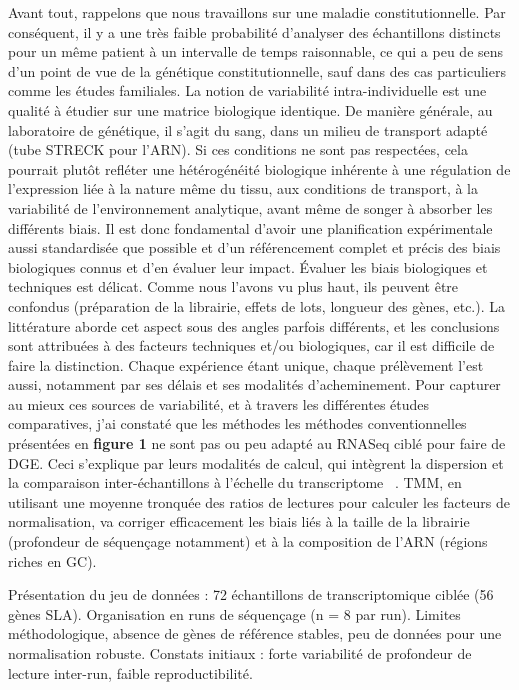 Avant tout, rappelons que nous travaillons sur une maladie constitutionnelle. Par conséquent, il y a une très faible probabilité d'analyser des échantillons distincts pour un même patient à un intervalle de temps raisonnable, ce qui a peu de sens d'un point de vue de la génétique constitutionnelle, sauf dans des cas particuliers comme les études familiales. La notion de variabilité intra-individuelle est une qualité à étudier sur une matrice biologique identique. De manière générale, au laboratoire de génétique, il s'agit du sang, dans un milieu de transport adapté (tube STRECK pour l'ARN). Si ces conditions ne sont pas respectées, cela pourrait plutôt refléter une hétérogénéité biologique inhérente à une régulation de l'expression liée à la nature même du tissu, aux conditions de transport, à la variabilité de l'environnement analytique, avant même de songer à absorber les différents biais.
Il est donc fondamental d'avoir une planification expérimentale aussi standardisée que possible et d'un référencement complet et précis des biais biologiques connus et d'en évaluer leur impact.
Évaluer les biais biologiques et techniques est délicat. Comme nous l'avons vu plus haut, ils peuvent être confondus (préparation de la librairie, effets de lots, longueur des gènes, etc.).
La littérature aborde cet aspect sous des angles parfois différents, et les conclusions sont attribuées à des facteurs techniques et/ou biologiques, car il est difficile de faire la distinction. 
 Chaque expérience étant unique, chaque prélèvement l'est aussi, notamment par ses délais et ses modalités d'acheminement. Pour capturer au mieux ces sources de variabilité, et à travers les différentes études comparatives, 
 j'ai constaté que les méthodes les méthodes conventionnelles présentées en \textbf{figure 1} ne sont pas ou peu adapté au RNASeq ciblé pour faire de DGE. Ceci s'explique par leurs modalités de calcul, qui intègrent la dispersion et la comparaison inter-échantillons à l'échelle du transcriptome ~\textsuperscript{\cite{dillies_comprehensive_2013}}. TMM, en utilisant une moyenne tronquée des ratios de lectures pour calculer les facteurs de normalisation,
  va corriger efficacement les biais liés à la taille de la librairie (profondeur de séquençage notamment) et à la composition de l'ARN (régions riches en GC)\textsuperscript{\cite{abrams_protocol_2019}}.
 
    Présentation du jeu de données : 72 échantillons de transcriptomique ciblée (56 gènes SLA).
    Organisation en runs de séquençage (n = 8 par run).
    Limites méthodologique,  absence de gènes de référence stables, peu de données pour une normalisation robuste.
    Constats initiaux : forte variabilité de profondeur de lecture inter-run, faible reproductibilité.
